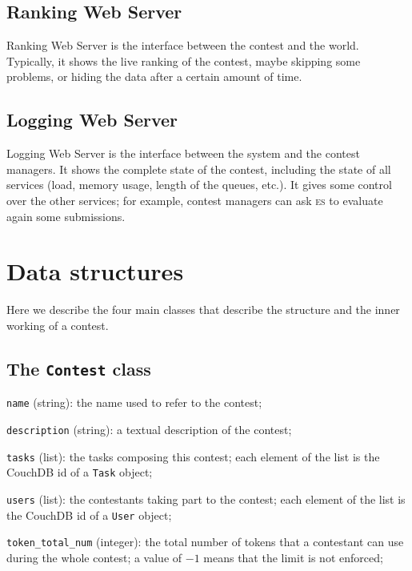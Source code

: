 \documentclass[a4paper,8pt]{amsart}
\newcommand{\ES}{\textsc{es}}
\newenvironment{squishlist}{%
  \begin{list}{\textbullet}%
    { \setlength{\itemsep}{0pt}%
      \setlength{\parsep}{3pt}%
      \setlength{\topsep}{3pt}%
      \setlength{\partopsep}{0pt}%
      \setlength{\leftmargin}{1.5em}%
      \setlength{\labelwidth}{1em}%
      \setlength{\labelsep}{0.5em} }%
}{\end{list}}
\newcommand{\id}[1]{\texttt{#1}}
\begin{document}
\begin{multicols}{2}
  \subsection{Ranking Web Server}

  Ranking Web Server is the interface between the contest and the
  world. Typically, it shows the live ranking of the contest, maybe
  skipping some problems, or hiding the data after a certain amount of
  time.

  \subsection{Logging Web Server}

  Logging Web Server is the interface between the system and the
  contest managers. It shows the complete state of the contest,
  including the state of all services (load, memory usage, length of
  the queues, etc.). It gives some control over the other services;
  for example, contest managers can ask \ES{} to evaluate again some
  submissions.

  \section{Data structures}

  Here we describe the four main classes that describe the structure
  and the inner working of a contest.

  \subsection{The \id{Contest} class}

  \begin{squishlist}

  \item \id{name} (string): the name used to refer to the contest;

  \item \id{description} (string): a textual description of the
    contest;

  \item \id{tasks} (list): the tasks composing this contest; each
    element of the list is the CouchDB id of a \id{Task} object;

  \item \id{users} (list): the contestants taking part to the
    contest; each element of the list is the CouchDB id of a
    \id{User} object;

  \item \id{token\_total\_num} (integer): the total number of tokens
    that a contestant can use during the whole contest; a value of
    $-1$ means that the limit is not enforced;


\end{squishlist}
\end{multicols}
\end{document}
